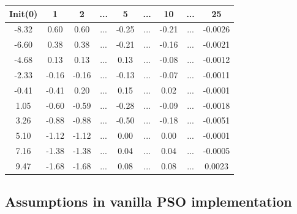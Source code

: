 \documentclass{article}
\begin{document}
\begin{center}

\begin{tabular}{ |c|c|c|c|c|c|c|c|c| } 
\hline
Init(0) & 1 & 2 & ... & 5 & ... & 10 & ... & 25\\
\hline
-8.32 &  0.60 &  0.60 & ... & -0.25 & ... &  -0.21 & ... & -0.0026\\ 
-6.60 &  0.38 &  0.38 & ... & -0.21 & ... &  -0.16 & ... & -0.0021\\  
-4.68 &  0.13 &  0.13 & ... &  0.13 & ... &  -0.08 & ... & -0.0012\\  
-2.33 & -0.16 & -0.16 & ... & -0.13 & ... &  -0.07 & ... & -0.0011\\ 
-0.41 & -0.41 &  0.20 & ... &  0.15 & ... &   0.02 & ... & -0.0001\\  
 1.05 & -0.60 & -0.59 & ... & -0.28 & ... &  -0.09 & ... & -0.0018\\ 
 3.26 & -0.88 & -0.88 & ... & -0.50 & ... &  -0.18 & ... & -0.0051\\ 
 5.10 & -1.12 & -1.12 & ... &  0.00 & ... &   0.00 & ... & -0.0001\\  
 7.16 & -1.38 & -1.38 & ... &  0.04 & ... &   0.04 & ... & -0.0005\\ 
 9.47 & -1.68 & -1.68 & ... &  0.08 & ... &   0.08 & ... &  0.0023\\ 
\hline
\end{tabular}


\end{center}

\subsection{Assumptions in vanilla PSO implementation}
\end{document}
